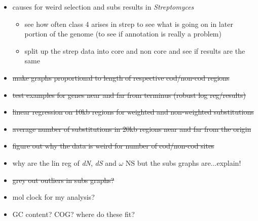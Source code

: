 \documentclass[12pt]{article}
\newcommand{\strep}{\textit{Streptomyces}\xspace}
\newcommand{\dn}{\textit{dN}\xspace}
\newcommand{\ds}{\textit{dS}\xspace}
\begin{document}
\begin{itemize}
	\item causes for weird selection and subs results in \strep
	\begin{itemize}
		\item see how often class 4 arises in strep to see what is going on in later portion of the genome (to see if annotation is really a problem)
		
		\item split up the strep data into core and non core and see if results are the same
	\end{itemize}
	
	\item \sout{make graphs proportional to length of respective cod/non-cod regions}
	
	\item \sout{test examples for genes near and far from terminus (robust log reg/results)}
	
	\item \sout{linear regression on 10kb regions for weighted and non-weighted substitutions}
	
	\item \sout{average number of substitutions in 20kb regions near and far from the origin}
	
	\item \sout{figure out why the data is weird for number of cod/non-cod sites}
	
	\item why are the lin reg of \dn, \ds and $\omega$ NS but the subs graphs are...explain!
	
	\item \sout{grey out outliers in subs graphs?}
	
	\item mol clock for my analysis?
	
	\item GC content? COG? where do these fit?
	
\end{itemize}
\end{document}
